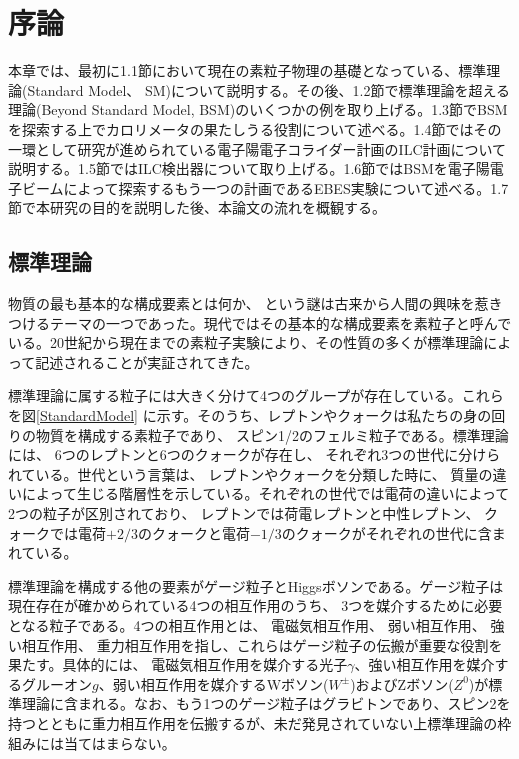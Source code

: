 
\chapter{序論} \label{sec:Introduction}

本章では、最初に1.1節において現在の素粒子物理の基礎となっている、標準理論(Standard Model、 SM)について説明する。その後、1.2節で標準理論を超える理論(Beyond Standard Model, BSM)のいくつかの例を取り上げる。1.3節でBSMを探索する上でカロリメータの果たしうる役割について述べる。1.4節ではその一環として研究が進められている電子陽電子コライダー計画のILC計画について説明する。1.5節ではILC検出器について取り上げる。1.6節ではBSMを電子陽電子ビームによって探索するもう一つの計画であるEBES実験について述べる。1.7節で本研究の目的を説明した後、本論文の流れを概観する。



\section{標準理論}
物質の最も基本的な構成要素とは何か、 という謎は古来から人間の興味を惹きつけるテーマの一つであった。現代ではその基本的な構成要素を素粒子と呼んでいる。20世紀から現在までの素粒子実験により、その性質の多くが標準理論によって記述されることが実証されてきた。

標準理論に属する粒子には大きく分けて4つのグループが存在している。これらを図\ref{StandardModel}
に示す。そのうち、レプトンやクォークは私たちの身の回りの物質を構成する素粒子であり、 スピン1/2のフェルミ粒子である。標準理論には、 6つのレプトンと6つのクォークが存在し、 それぞれ3つの世代に分けられている。世代という言葉は、 レプトンやクォークを分類した時に、 質量の違いによって生じる階層性を示している。それぞれの世代では電荷の違いによって2つの粒子が区別されており、 レプトンでは荷電レプトンと中性レプトン、 クォークでは電荷$+2/3$のクォークと電荷$-1/3$のクォークがそれぞれの世代に含まれている。

標準理論を構成する他の要素がゲージ粒子とHiggsボソンである。ゲージ粒子は現在存在が確かめられている4つの相互作用のうち、 3つを媒介するために必要となる粒子である。4つの相互作用とは、 電磁気相互作用、 弱い相互作用、 強い相互作用、 重力相互作用を指し、これらはゲージ粒子の伝搬が重要な役割を果たす。具体的には、 電磁気相互作用を媒介する光子$\gamma$、強い相互作用を媒介するグルーオン$g$、弱い相互作用を媒介するWボソン($W^\pm$)およびZボソン($Z^0$)が標準理論に含まれる。なお、もう1つのゲージ粒子はグラビトンであり、スピン2を持つとともに重力相互作用を伝搬するが、未だ発見されていない上標準理論の枠組みには当てはまらない。

